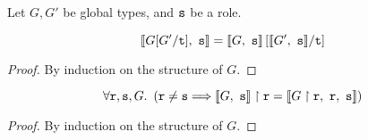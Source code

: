 \begin{lemma}
Let $G, G'$ be global types, and ${\mathtt{s}}$ be a role.

\[
\llbracket {G[G' / \textnormal{\texttt{t}}]},~{\mathtt{s}} \rrbracket = \llbracket {G},~{\mathtt{s}} \rrbracket\left[ \llbracket {G'},~{\mathtt{s}} \rrbracket / \textnormal{\texttt{t}} \right]
\]

\label{lem:encsub}
\end{lemma}

\begin{proof}
By induction on the structure of $G$.
\end{proof}

\begin{lemma}

\[
\forall {\mathtt{r}}, {\mathtt{s}}, G. ~ \left(
{\mathtt{r}} \neq {\mathtt{s}} 
	\Longrightarrow
{ \llbracket {G},~ {\mathtt{s}}  \rrbracket } \upharpoonright {\mathtt{r}} = \llbracket { {G} \upharpoonright {\mathtt{r}}  },~{\mathtt{r}},~{\mathtt{s}} \rrbracket
\right)
\]

\label{lem:enclink}
\end{lemma}

\begin{proof}
By induction on the structure of $G$.
\end{proof}
